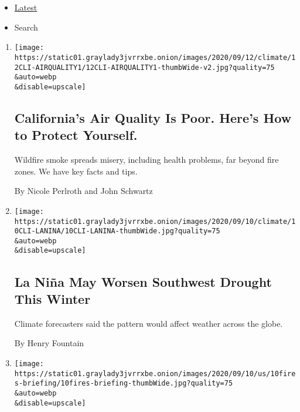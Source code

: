 \begin{itemize}
\tightlist
\item
  \protect\hyperlink{stream-panel}{Latest}
\item
  Search
\end{itemize}

\begin{enumerate}
\def\labelenumi{\arabic{enumi}.}
\item
  \href{/2020/09/11/climate/california-smoke-wildfires.html}{}

  \texttt{[image: https://static01.graylady3jvrrxbe.onion/images/2020/09/12/climate/12CLI-AIRQUALITY1/12CLI-AIRQUALITY1-thumbWide-v2.jpg?quality=75\\\&auto=webp\\\&disable=upscale]}

  \hypertarget{californias-air-quality-is-poor-heres-how-to-protect-yourself}{%
  \subsection{California's Air Quality Is Poor. Here's How to Protect
  Yourself.}\label{californias-air-quality-is-poor-heres-how-to-protect-yourself}}

  Wildfire smoke spreads misery, including health problems, far beyond
  fire zones. We have key facts and tips.

  By Nicole Perlroth and John Schwartz
\item
  \href{/2020/09/10/climate/la-nina-southwest-drought.html}{}

  \texttt{[image: https://static01.graylady3jvrrxbe.onion/images/2020/09/10/climate/10CLI-LANINA/10CLI-LANINA-thumbWide.jpg?quality=75\\\&auto=webp\\\&disable=upscale]}

  \hypertarget{la-niuxf1a-may-worsen-southwest-drought-this-winter}{%
  \subsection{La Niña May Worsen Southwest Drought This
  Winter}\label{la-niuxf1a-may-worsen-southwest-drought-this-winter}}

  Climate forecasters said the pattern would affect weather across the
  globe.

  By Henry Fountain
\item
  \href{/2020/09/10/climate/wildfires-climate-policy.html}{}

  \texttt{[image: https://static01.graylady3jvrrxbe.onion/images/2020/09/10/us/10fires-briefing/10fires-briefing-thumbWide.jpg?quality=75\\\&auto=webp\\\&disable=upscale]}


\end{enumerate}
